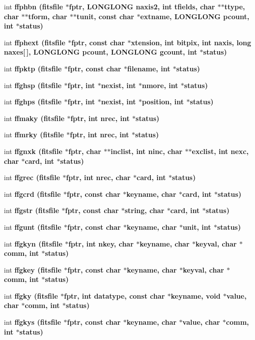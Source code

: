 \begin{CompactItemize}
\item 
int \bf{ffphbn} (\bf{fitsfile} $\ast$fptr, \bf{LONGLONG} naxis2, int tfields, char $\ast$$\ast$ttype, char $\ast$$\ast$tform, char $\ast$$\ast$tunit, const char $\ast$extname, \bf{LONGLONG} pcount, int $\ast$status)
\item 
int \bf{ffphext} (\bf{fitsfile} $\ast$fptr, const char $\ast$xtension, int bitpix, int naxis, long naxes[$\,$], \bf{LONGLONG} pcount, \bf{LONGLONG} gcount, int $\ast$status)
\item 
int \bf{ffpktp} (\bf{fitsfile} $\ast$fptr, const char $\ast$filename, int $\ast$status)
\item 
int \bf{ffghsp} (\bf{fitsfile} $\ast$fptr, int $\ast$nexist, int $\ast$nmore, int $\ast$status)
\item 
int \bf{ffghps} (\bf{fitsfile} $\ast$fptr, int $\ast$nexist, int $\ast$position, int $\ast$status)
\item 
int \bf{ffmaky} (\bf{fitsfile} $\ast$fptr, int nrec, int $\ast$status)
\item 
int \bf{ffmrky} (\bf{fitsfile} $\ast$fptr, int nrec, int $\ast$status)
\item 
int \bf{ffgnxk} (\bf{fitsfile} $\ast$fptr, char $\ast$$\ast$inclist, int ninc, char $\ast$$\ast$exclist, int nexc, char $\ast$card, int $\ast$status)
\item 
int \bf{ffgrec} (\bf{fitsfile} $\ast$fptr, int nrec, char $\ast$card, int $\ast$status)
\item 
int \bf{ffgcrd} (\bf{fitsfile} $\ast$fptr, const char $\ast$keyname, char $\ast$card, int $\ast$status)
\item 
int \bf{ffgstr} (\bf{fitsfile} $\ast$fptr, const char $\ast$string, char $\ast$card, int $\ast$status)
\item 
int \bf{ffgunt} (\bf{fitsfile} $\ast$fptr, const char $\ast$keyname, char $\ast$unit, int $\ast$status)
\item 
int \bf{ffgkyn} (\bf{fitsfile} $\ast$fptr, int nkey, char $\ast$keyname, char $\ast$keyval, char $\ast$comm, int $\ast$status)
\item 
int \bf{ffgkey} (\bf{fitsfile} $\ast$fptr, const char $\ast$keyname, char $\ast$keyval, char $\ast$comm, int $\ast$status)
\item 
int \bf{ffgky} (\bf{fitsfile} $\ast$fptr, int \bf{datatype}, const char $\ast$keyname, void $\ast$value, char $\ast$comm, int $\ast$status)
\item 
int \bf{ffgkys} (\bf{fitsfile} $\ast$fptr, const char $\ast$keyname, char $\ast$value, char $\ast$comm, int $\ast$status)
$$
\end{CompactItemize}
